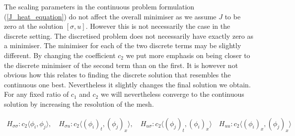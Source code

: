 \documentclass[../draft_1.tex]{subfiles}
\begin{document}
The scaling parameters in the continuous problem formulation (\ref{J_heat_equation}) do not affect the overall minimiser as we assume $J$ to be zero at the solution $[\sigma, u]$. However this is not necessarily the case in the discrete setting. The discretised problem does not necessarily have exactly zero as a minimiser. The minimiser for each of the two discrete terms may be slightly different. By changing the coefficient $c_2$ we put more emphasis on being closer to the discrete minimiser of the second term than on the first. It is however not obvious how this relates to finding the discrete solution that resembles the continuous one best. Nevertheless it slightly changes the final solution we obtain. For any fixed ratio of $c_1$ and $c_2$ we will nevertheless converge to the continuous solution by increasing the resolution of the mesh.



\begin{ceqn}
	\begin{equation}
	\begin{aligned}
H_{\sigma \sigma}: c_2 \langle \phi_i, \phi_j \rangle, \quad H_{\sigma u}: c_2 \langle (\phi_i)_t, (\phi_j)_x \rangle, \quad H_{u \sigma}: c_2 \langle (\phi_j)_t, (\phi_i)_x \rangle \quad H_{uu}: c_2 \langle (\phi_i)_x, (\phi_j)_x \rangle
	\end{aligned}
	\end{equation}
\end{ceqn}
\end{document}
